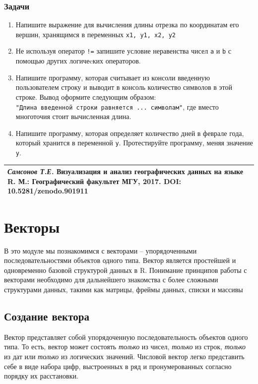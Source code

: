 \documentclass[]{book}
\begin{document}
\subsection{Задачи}

\begin{enumerate}
\def\labelenumi{\arabic{enumi}.}
\item
  Напишите выражение для вычисления длины отрезка по координатам его
  вершин, хранящимся в переменных \texttt{x1,\ y1,\ x2,\ y2}
\item
  Не используя оператор \texttt{!=} запишите условие неравенства чисел
  \texttt{a} и \texttt{b} с помощью других логичеcких операторов.
\item
  Напишите программу, которая считывает из консоли введенную
  пользователем строку и выводит в консоль количество символов в этой
  строке. Вывод оформите следующим образом:
  \texttt{"Длина\ введенной\ строки\ равняется\ ...\ символам"}, где
  вместо многоточия стоит вычисленная длина.
\item
  Напишите программу, которая определяет количество дней в феврале года,
  который хранится в переменной \texttt{y}. Протестируйте программу,
  меняя значение \texttt{y}.
\end{enumerate}

\begin{longtable}[]{@{}l@{}}
\toprule
\emph{Самсонов Т.Е.} \textbf{Визуализация и анализ географических данных
на языке R.} М.: Географический факультет МГУ, 2017. DOI:
10.5281/zenodo.901911\tabularnewline
\bottomrule
\end{longtable}

\chapter{Векторы}\label{vectors}

В это модуле мы познакомимся с векторами -- упорядоченными
последовательностями объектов одного типа. Вектор является простейшей и
одновременно базовой структурой данных в R. Понимание принципов работы с
векторами необходимо для дальнейшего знакомства с более сложными
структурами данных, такими как матрицы, фреймы данных, списки и массивы

\section{Создание вектора}\label{vector_creation}

Вектор представляет собой упорядоченную последовательность объектов
одного типа. То есть, вектор может состоять \emph{только} из чисел,
\emph{только} из строк, \emph{только} из дат или \emph{только} из
логических значений. Числовой вектор легко представить себе в виде
набора цифр, выстроенных в ряд и пронумерованных согласно порядку их
расстановки.
\end{document}
